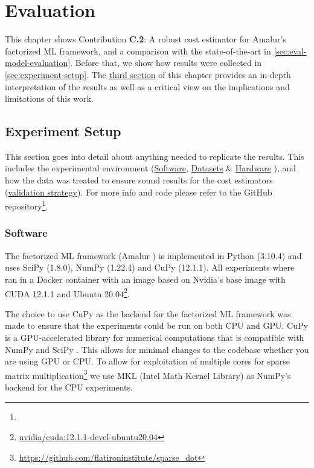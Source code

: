 
\chapter{Evaluation}
\label{chapter:evaluation-discussion}
This chapter shows Contribution \textbf{C.2}: A robust cost estimator for Amalur's factorized ML framework, and a comparison with the state-of-the-art in \autoref{sec:eval-model-evaluation}. Before that, we show how results were collected in \autoref{sec:experiment-setup}. The \hyperref[sec:eval-discussion]{third section} of this chapter provides an in-depth interpretation of the results as well as a critical view on the implications and limitations of this work.

\section{Experiment Setup}
\label{sec:experiment-setup}

This section goes into detail about anything needed to replicate the results. This includes the experimental environment (\hyperref[subsec:6-software]{Software}, \hyperref[subsec:6-datasets]{Datasets} \& \hyperref[subsec:6-hardware]{Hardware} ),  and how the data was treated to ensure sound results for the cost estimators (\hyperref[subsec:6-validation-strategy]{validation strategy}). For more info and code please refer to the GitHub repository\footnote{}.

\subsection{Software}
\label{subsec:6-software}
The factorized ML framework (Amalur \cite{amalur}) is implemented in Python (3.10.4) and uses SciPy (1.8.0), NumPy (1.22.4) and CuPy (12.1.1). All experiments where ran in a Docker container with an image based on Nvidia's base image with CUDA 12.1.1 and Ubuntu 20.04\footnote{\href{https://hub.docker.com/layers/nvidia/cuda/12.1.1-devel-ubuntu20.04/images/sha256-5bd13c67a4479a1c13238b470d89a92937ce68ba5f21b930d50c463e3314f657?context=explore}{nvidia/cuda:12.1.1-devel-ubuntu20.04}}.

The choice to use CuPy as the backend for the factorized ML framework was made to ensure that the experiments could be run on both CPU and GPU. CuPy is a GPU-accelerated library for numerical computations that is compatible with NumPy and SciPy \cite{cupy_learningsys2017}. This allows for minimal changes to the codebase whether you are using GPU or CPU. To allow for exploitation of multiple cores for sparse matrix multiplication\footnote{\url{https://github.com/flatironinstitute/sparse_dot}} we use MKL (Intel Math Kernel Library) \cite{intel-mkl} as NumPy's backend for the CPU experiments.

